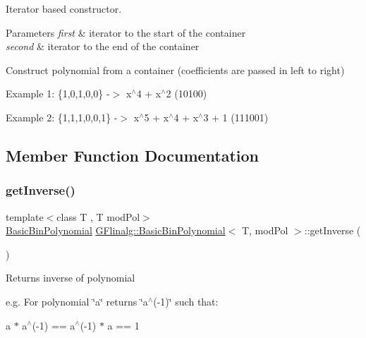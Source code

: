 Iterator based constructor. 


\begin{DoxyParams}{Parameters}
{\em first} & iterator to the start of the container \\
\hline
{\em second} & iterator to the end of the container\\
\hline
\end{DoxyParams}
Construct polynomial from a container (coefficients are passed in left to right)

Example 1\+: \{1,0,1,0,0\} -\/$>$ x$^\wedge$4 + x$^\wedge$2 (10100)

Example 2\+: \{1,1,1,0,0,1\} -\/$>$ x$^\wedge$5 + x$^\wedge$4 + x$^\wedge$3 + 1 (111001) 

\subsection{Member Function Documentation}
\mbox{\label{class_g_flinalg_1_1_basic_bin_polynomial_ab2cbcd0f6bb296208a7c6430281c2cca}} 
\subsubsection{\texorpdfstring{getInverse()}{getInverse()}}
{\footnotesize\ttfamily template$<$class T , T mod\+Pol$>$ \\
\mbox{\hyperlink{class_g_flinalg_1_1_basic_bin_polynomial}{Basic\+Bin\+Polynomial}} \mbox{\hyperlink{class_g_flinalg_1_1_basic_bin_polynomial}{G\+Flinalg\+::\+Basic\+Bin\+Polynomial}}$<$ T, mod\+Pol $>$\+::get\+Inverse (\begin{DoxyParamCaption}{ }\end{DoxyParamCaption})\hspace{0.3cm}{\ttfamily [inline]}}

Returns inverse of polynomial

e.\+g. For polynomial \char`\"{}a\char`\"{} returns \char`\"{}a$^\wedge$(-\/1)\char`\"{} such that\+:

a $\ast$ a$^\wedge$(-\/1) == a$^\wedge$(-\/1) $\ast$ a == 1 \mbox{\label{class_g_flinalg_1_1_basic_bin_polynomial_a8094917d7e143f78f735f23830f43d8a}} 
